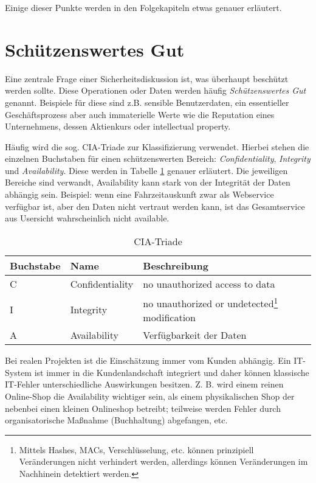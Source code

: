 Einige dieser Punkte werden in den Folgekapiteln etwas genauer erläutert.

\section{Schützenswertes Gut}

Eine zentrale Frage einer Sicherheitsdiskussion ist, was überhaupt beschützt werden sollte. Diese Operationen oder Daten werden häufig \textit{Schützenswertes Gut} genannt. Beispiele für diese sind z.B. sensible Benutzerdaten, ein essentieller Geschäftsprozess aber auch immaterielle Werte wie die Reputation eines Unternehmens, dessen Aktienkurs oder intellectual property.

Häufig wird die sog. CIA-Triade zur Klassifizierung verwendet. Hierbei stehen die einzelnen Buchstaben für einen schützenswerten Bereich: \textit{Confidentiality}, \textit{Integrity} und \textit{Availability}. Diese werden in Tabelle \ref{tbl:cia_triad} genauer erläutert. Die jeweiligen Bereiche sind verwandt, Availability kann stark von der Integrität der Daten abhängig sein. Beispiel: wenn eine Fahrzeitauskunft zwar als Webservice verfügbar ist, aber den Daten nicht vertraut werden kann, ist das Gesamtservice aus Usersicht wahrscheinlich nicht available.

\begin{table}
	\begin{center}
\begin{tabular}{llp{5cm}}
	\toprule
	Buchstabe & Name & Beschreibung \\
	\midrule
	C & Confidentiality & no unauthorized access to data \\
	I & Integrity & no unauthorized or undetected\footnote{Mittels Hashes, MACs, Verschlüsselung, etc. können prinzipiell Veränderungen nicht verhindert werden, allerdings können Veränderungen im Nachhinein detektiert werden.} modification \\
	A & Availability & Verfügbarkeit der Daten \\
	\bottomrule
\end{tabular}
\end{center}
\caption{CIA-Triade}
\label{tbl:cia_triad}
\end{table}

Bei realen Projekten ist die Einschätzung immer vom Kunden abhängig. Ein IT-System ist immer in die Kundenlandschaft integriert und daher können klassische IT-Fehler unterschiedliche Auswirkungen besitzen. Z. B. wird einem reinen Online-Shop die Availability wichtiger sein, als einem physikalischen Shop der nebenbei einen kleinen Onlineshop betreibt; teilweise werden Fehler durch organisatorische Maßnahme (Buchhaltung) abgefangen, etc.

